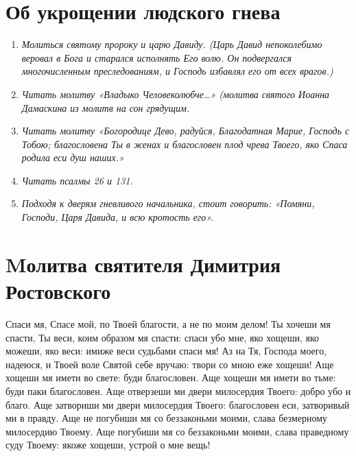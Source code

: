 \section{Об укрощении людского гнева}\begin{mymulticols}
 
\begin{enumerate}

\item \itshape Молиться святому пророку и царю Давиду. (Царь Давид непоколебимо веровал в Бога и старался исполнять Его волю. Он подвергался многочисленным преследованиям, и Господь избавлял его от всех врагов.)\normalfont{}

\item \itshape Читать молитву\normalfont{} «Владыко Человеколюбче…» (\itshape молитва святого Иоанна Дамаскина из молитв на сон грядущим.\normalfont{}

\item \itshape Читать молитву\normalfont{} «Богородице Дево, радуйся, Благодатная Марие, Господь с Тобою; благословена Ты в женах и благословен плод чрева Твоего, яко Спаса родила еси душ наших.»

\item \itshape Читать псалмы 26 и 131.\normalfont{}

\item \itshape Подходя к дверям гневливого начальника, стоит говорить:\normalfont{} «Помяни, Господи, Царя Давида, и всю кротость его».

\end{enumerate}

\end{mymulticols}

\section{Mолитва святителя Димитрия Ростовского}\begin{mymulticols}
 

Спаси мя, Спасе мой, по Твоей благости, а не по моим делом! Ты хочеши мя спасти, Ты веси, коим образом мя спасти: спаси убо мне, яко хощеши, яко можеши, яко веси: имиже веси судьбами спаси мя! Аз на Тя, Господа моего, надеюся, и Твоей воле Святой себе вручаю: твори со мною еже хощеши! Аще хощеши мя имети во свете: буди благословен. Аще хощеши мя имети во тьме: буди паки благословен. Аще отверзеши ми двери милосердия Твоего: добро убо и благо. Аще затвориши ми двери милосердия Твоего: благословен еси, затворивый ми в правду. Аще не погубиши мя со беззаконьми моими, слава безмерному милосердию Твоему. Аще погубиши мя со беззаконьми моими, слава праведному суду Твоему: якоже хощеши, устрой о мне вещь!

\end{mymulticols}

